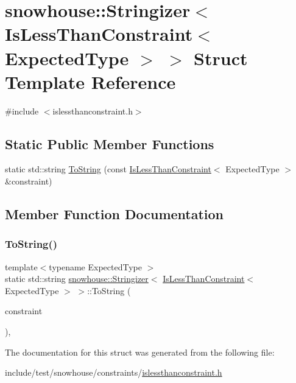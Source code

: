 \hypertarget{structsnowhouse_1_1Stringizer_3_01IsLessThanConstraint_3_01ExpectedType_01_4_01_4}{}\section{snowhouse\+::Stringizer$<$ Is\+Less\+Than\+Constraint$<$ Expected\+Type $>$ $>$ Struct Template Reference}
\label{structsnowhouse_1_1Stringizer_3_01IsLessThanConstraint_3_01ExpectedType_01_4_01_4}


{\ttfamily \#include $<$islessthanconstraint.\+h$>$}

\subsection*{Static Public Member Functions}
\begin{DoxyCompactItemize}
\item 
static std\+::string \mbox{\hyperlink{structsnowhouse_1_1Stringizer_3_01IsLessThanConstraint_3_01ExpectedType_01_4_01_4_a9c3f775bcb5d751d37f63f9f90715bfd}{To\+String}} (const \mbox{\hyperlink{structsnowhouse_1_1IsLessThanConstraint}{Is\+Less\+Than\+Constraint}}$<$ Expected\+Type $>$ \&constraint)
\end{DoxyCompactItemize}


\subsection{Member Function Documentation}
\mbox{\label{structsnowhouse_1_1Stringizer_3_01IsLessThanConstraint_3_01ExpectedType_01_4_01_4_a9c3f775bcb5d751d37f63f9f90715bfd}} 
\subsubsection{\texorpdfstring{ToString()}{ToString()}}
{\footnotesize\ttfamily template$<$typename Expected\+Type $>$ \\
static std\+::string \mbox{\hyperlink{structsnowhouse_1_1Stringizer}{snowhouse\+::\+Stringizer}}$<$ \mbox{\hyperlink{structsnowhouse_1_1IsLessThanConstraint}{Is\+Less\+Than\+Constraint}}$<$ Expected\+Type $>$ $>$\+::To\+String (\begin{DoxyParamCaption}\item[{const \mbox{\hyperlink{structsnowhouse_1_1IsLessThanConstraint}{Is\+Less\+Than\+Constraint}}$<$ Expected\+Type $>$ \&}]{constraint }\end{DoxyParamCaption})\hspace{0.3cm}{\ttfamily [inline]}, {\ttfamily [static]}}



The documentation for this struct was generated from the following file\+:\begin{DoxyCompactItemize}
\item 
include/test/snowhouse/constraints/\mbox{\hyperlink{islessthanconstraint_8h}{islessthanconstraint.\+h}}\end{DoxyCompactItemize}
